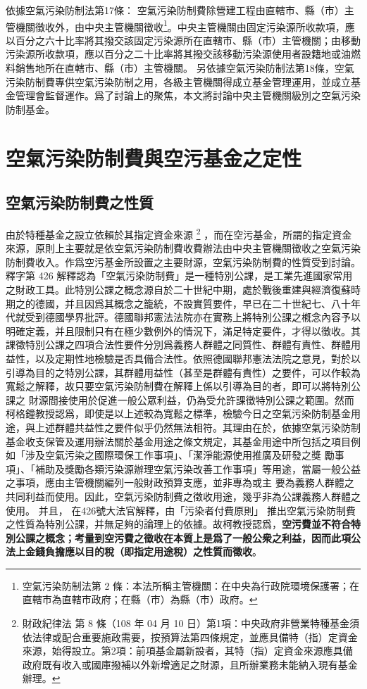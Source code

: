 \documentclass[12pt,a4paper]{article}
\begin{document}
依據空氣污染防制法第17條：
空氣污染防制費除營建工程由直轄市、縣（市）主管機關徵收外，由中央主管機關徵收\footnote{空氣污染防制法第 2 條：本法所稱主管機關：在中央為行政院環境保護署；在直轄市為直轄市政府；在縣（市）為縣（巿）政府。}。中央主管機關由固定污染源所收款項，應以百分之六十比率將其撥交該固定污染源所在直轄市、縣（市）主管機關；由移動污染源所收款項，應以百分之二十比率將其撥交該移動污染源使用者設籍地或油燃料銷售地所在直轄市、縣（市）主管機關。
另依據空氣污染防制法第18條，空氣污染防制費專供空氣污染防制之用，各級主管機關得成立基金管理運用，並成立基金管理會監督運作。爲了討論上的聚焦，本文將討論中央主管機關級別之空氣污染防制基金。



\section{空氣污染防制費與空污基金之定性}

\subsection{空氣污染防制費之性質}
由於特種基金之設立依賴於其指定資金來源
\footnote{財政紀律法 第 8 條（108 年 04 月 10 日）第1項：中央政府非營業特種基金須依法律或配合重要施政需要，按預算法第四條規定，並應具備特（指）定資金來源，始得設立。第2項：前項基金屬新設者，其特（指）定資金來源應具備政府既有收入或國庫撥補以外新增適足之財源，且所辦業務未能納入現有基金辦理。}
，而在空污基金，所謂的指定資金來源，原則上主要就是依空氣污染防制費收費辦法由中央主管機關徵收之空氣污染防制費收入。作爲空污基金所設置之主要財源，空氣污染防制費的性質受到討論。釋字第 426 解釋認為「空氣污染防制費」是一種特別公課，是工業先進國家常用之財政工具。此特別公課之概念源自於二十世紀中期，處於戰後重建與經濟復蘇時期之的德國，并且因爲其概念之籠統，不設實質要件，早已在二十世紀七、八十年代就受到德國學界批評。德國聯邦憲法法院亦在實務上將特別公課之槪念內容予以明確定義，并且限制只有在極少數例外的情況下，滿足特定要件，才得以徵收。其課徵特別公課之四項合法性要件分別爲義務人群體之同質性、群體有責性、群體用益性，以及定期性地檢驗是否具備合法性。依照德國聯邦憲法法院之意見，對於以引導為目的之特別公課，其群體用益性（甚至是群體有責性）之要件，可以作較為 寬鬆之解釋，故只要空氣污染防制費在解釋上係以引導為目的者，即可以將特別公課之 財源間接使用於促進一般公眾利益，仍為受允許課徵特別公課之範圍。然而柯格鐘教授認爲，即使是以上述較為寬鬆之標準，檢驗今日之空氣污染防制基金用途，與上述群體共益性之要件似乎仍然無法相符。其理由在於，依據空氣污染防制基金收支保管及運用辦法關於基金用途之條文規定，其基金用途中所包括之項目例如「涉及空氣污染之國際環保工作事項」、「潔淨能源使用推廣及研發之獎 勵事項」、「補助及獎勵各類污染源辦理空氣污染改善工作事項」等用途，當屬一般公益之事項，應由主管機關編列一般財政預算支應，並非專為或主 要為義務人群體之共同利益而使用。因此，空氣污染防制費之徵收用途，幾乎非為公課義務人群體之使用。
并且，
在426號大法官解釋，由「污染者付費原則」 推出空氣污染防制費之性質為特別公課，并無足夠的論理上的依據。故柯教授認爲，\textbf{空污費並不符合特別公課之概念；考量到空污費之徵收在本質上是爲了一般公衆之利益，因而此項公法上金錢負擔應以目的稅（即指定用途稅）之性質而徵收}。
\end{document}
